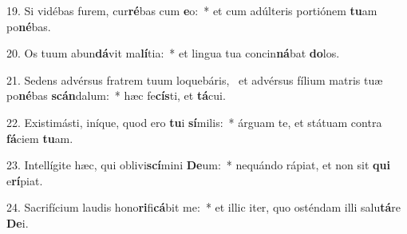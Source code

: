19. Si vidébas furem, cur\textbf{ré}bas cum \textbf{e}o:~*  et cum adúlteris portiónem \textbf{tu}am po\textbf{né}bas.\

20. Os tuum abun\textbf{dá}vit ma\textbf{lí}tia:~*  et lingua tua concin\textbf{ná}bat \textbf{do}los.\

21. Sedens advérsus fratrem tuum loquebáris, \dag\  et advérsus fílium matris tuæ po\textbf{né}bas \textbf{scán}dalum:~*  hæc fe\textbf{cís}ti, et \textbf{tá}cui.\

22. Existimásti, iníque, quod ero \textbf{tu}i \textbf{sí}milis:~*  árguam te, et státuam contra \textbf{fá}ciem \textbf{tu}am.\

23. Intellígite hæc, qui oblivi\textbf{scí}mini \textbf{De}um:~*  nequándo rápiat, et non sit \textbf{qui} e\textbf{rí}piat.\

24. Sacrifícium laudis hono\textbf{ri}fi\textbf{cá}bit me:~*  et illic iter, quo osténdam illi salu\textbf{tá}re \textbf{De}i.\

